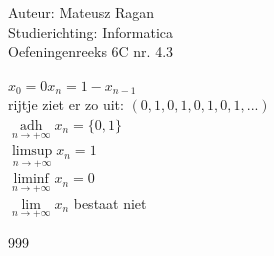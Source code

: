 \documentclass[a4paper]{article}
\begin{document}
\noindent \large Auteur: Mateusz Ragan \\
\noindent \large Studierichting: Informatica\\
\noindent \large Oefeningenreeks 6C nr. 4.3\\

\medskip

\normalsize

$x_0 = 0 x_n = 1-x_{n-1}$\\

rijtje ziet er zo uit: $\left(0,1,0,1,0,1,0,1,...\right)$\\

$\mathop{\operatorname{adh}}\limits_{n \rightarrow +\infty} x_n = \{ 0,1 \}$\\

$\limsup\limits_{n \rightarrow +\infty} x_n = 1$\\

$\liminf\limits_{n \rightarrow +\infty} x_n = 0$\\

$\lim\limits_{n \rightarrow +\infty} x_n$ bestaat niet\\

\begin{thebibliography}{999}
\end{thebibliography}
\end{document}
